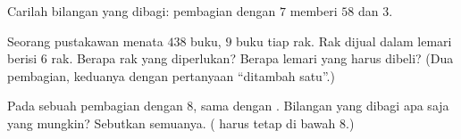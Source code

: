 \begin{exercise}[$\star$]\label{exo:g4:division:9}
Carilah bilangan yang dibagi: pembagian dengan $7$ memberi  $58$ dan  $3$.
\end{exercise}

\begin{exercise}[$\star\star$]\label{exo:g4:division:10}
Seorang pustakawan menata $438$ buku, $9$ buku tiap rak. Rak dijual
dalam lemari berisi $6$ rak. Berapa rak yang diperlukan? Berapa
lemari yang harus dibeli? (Dua pembagian, keduanya dengan
pertanyaan ``ditambah satu''.)
\end{exercise}

\begin{exercise}[$\star\star$]\label{exo:g4:division:11}
Pada sebuah pembagian dengan $8$,  sama dengan .
Bilangan yang dibagi apa saja yang mungkin? Sebutkan semuanya.
( harus tetap di bawah $8$.)

\end{exercise}
